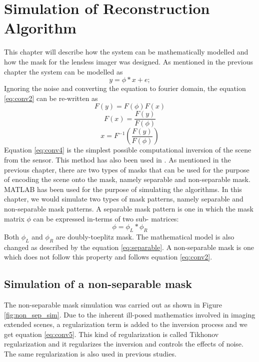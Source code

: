 \chapter{Simulation of Reconstruction Algorithm}
This chapter will describe how the system can be mathematically modelled and how the mask for the lensless imager was designed. As mentioned in the previous chapter the system can be modelled as 
\begin{equation}
\label{eq:conv2}
y = \phi * x + e ;
\end{equation}
Ignoring the noise and converting the equation to fourier domain, the equation \ref{eq:conv2} can be re-written as
\begin{equation}
\label{eq:conv3}
F(y) = F(\phi)F(x)
\end{equation}
\begin{equation}
\label{eq:conv3}
F(x) = \frac{F(y)}{F(\phi)}
\end{equation}
\begin{equation}
\label{eq:conv4}
x = F^{-1}(\frac{F(y)}{F(\phi)})
\end{equation}
Equation \ref{eq:conv4} is the simplest possible computational inversion of the scene from the sensor. This method has also been used in \cite{Toeplitz}. As mentioned in the previous chapter, there are two types of masks that can be used for the purpose of encoding the scene onto the mask, namely separable and non-separable mask. MATLAB has been used for the purpose of simulating the algorithms. In this chapter, we would simulate two types of mask patterns, namely separable and non-separable mask patterns. A separable mask pattern is one in which the mask matrix $\phi$ can be expressed in-terms of two sub- matrices:
\begin{equation}
\phi = \phi_L * \phi_R
\end{equation}
Both $\phi_L$ and $\phi_R$ are doubly-toeplitz mask. The mathematical model is also changed as described by the equation \ref{eq:separable}. A non-separable mask is one which does not follow this property and follows equation \ref{eq:conv2}.

\section{Simulation of a non-separable mask}
The non-separable mask simulation was carried out as shown in Figure \ref{fig:non_sep_sim}. Due to the inherent ill-posed mathematics involved in imaging extended scenes, a regularization term is added to the inversion process and we get equation \ref{eq:conv5}. This kind of regularization is called Tikhonov regularization and it regularizes the inversion and controls the effects of noise\cite{Toeplitz}. The same regularization is also used in previous studies\cite{Toeplitz}.

